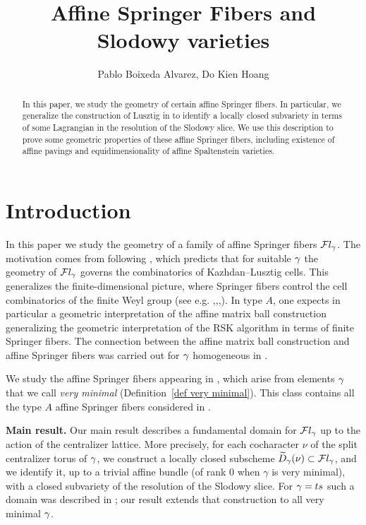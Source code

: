 \documentclass[11pt]{article}
\title{Affine Springer Fibers and Slodowy varieties}
\numberwithin{equation}{section}
\begin{document}
\author{Pablo Boixeda Alvarez, Do Kien Hoang} 
\date{}
\maketitle
\begin{abstract}
    In this paper, we study the geometry of certain affine Springer fibers. In particular, we generalize the construction of Lusztig in \cite{remarkASF} to identify a locally closed subvariety in terms of some Lagrangian in the resolution of the Slodowy slice. We use this description to prove some geometric properties of these affine Springer fibers, including existence of affine pavings and equidimensionality of affine Spaltenstein varieties.
\end{abstract}
\section{Introduction}
In this paper we study the geometry of a family of affine Springer fibers $\mathcal{F} l_\gamma$.
The motivation comes from \cite{Anlong} following \cite{Yun2021}, which predicts that for suitable
$\gamma$ the geometry of $\mathcal{F} l_\gamma$ governs the combinatorics of Kazhdan--Lusztig cells.
This generalizes the finite-dimensional picture, where Springer fibers control the
cell combinatorics of the finite Weyl group (see e.g. \cite{Lus87},\cite{McG99},\cite{LO14},\cite{Hoangstabilizer}). In type $A$, one
expects in particular a geometric interpretation of the affine matrix ball
construction generalizing the geometric interpretation of the RSK algorithm in terms of finite Springer fibers. The connection between the affine matrix ball construction and affine Springer fibers was carried out for $\gamma$ homogeneous in \cite{BAYY}.

We study the affine Springer fibers appearing in \cite{Anlong}, which arise
from elements $\gamma$ that we call \emph{very minimal}
(Definition~\ref{def very minimal}). This class contains all the type $A$ affine
Springer fibers considered in \cite{Anlong}.

\medskip
\noindent\textbf{Main result.}
Our main result describes a fundamental domain for $\mathcal{F} l_\gamma$ up to the action of
the centralizer lattice. More precisely, for each cocharacter $\nu$ of the split
centralizer torus of $\gamma$, we construct a locally closed subscheme
$\widetilde{D}_\gamma(\nu) \subset \mathcal{F} l_\gamma$, and we identify it,  up to a trivial affine bundle (of rank $0$ when $\gamma$ is very minimal), with a closed
subvariety of the resolution of the Slodowy slice. For $\gamma = ts$ such a domain was
described in \cite{remarkASF}; our result extends that construction to all very
minimal $\gamma$.
\end{document}
